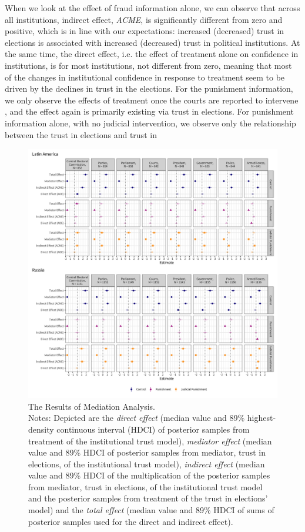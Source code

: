 \documentclass[11pt, ngerman,english,a4]{article}
\begin{document}
When we look at the effect of fraud information alone, we can observe that across all institutions, indirect effect, \textit{ACME}, is significantly different from zero and positive, which is in line with our expectations: increased (decreased) trust in elections is associated with increased (decreased) trust in political institutions. At the same time, the direct effect, i.e. the effect of treatment alone on confidence in institutions, is for most institutions, not different from zero, meaning that most of the changes in institutional confidence in response to treatment seem to be driven by the declines in trust in the elections. For the punishment information, we only observe the effects of treatment once the courts are reported to intervene , and the effect again is primarily existing via trust in elections. For punishment information alone, with no judicial intervention, we observe only the relationship between the trust in elections and trust in 

\begin{figure}[H]
	\centering
	\includegraphics[width=\linewidth,trim=4 4 4 4,clip]{figs/mediation.png}
	\caption{The Results of Mediation Analysis.  \\
		\footnotesize{Notes: Depicted are the \textit{direct effect }(median value and 89\% highest-density continuous interval (HDCI) of posterior samples from treatment of the institutional trust model), \textit{mediator effect} (median value and 89\% HDCI of posterior samples from mediator, trust in elections, of the institutional trust model), \textit{indirect effect} (median value and 89\% HDCI of the multiplication of the posterior samples from mediator, trust in elections,  of the institutional trust model and the posterior samples from treatment of the trust in elections' model) and the \textit{total effect} (median value and 89\% HDCI of sums of posterior samples used for the direct and indirect effect).  } 
	}
	\singlespacing
	\raggedright
	\label{fig:mediation}
\end{figure}
\end{document}
